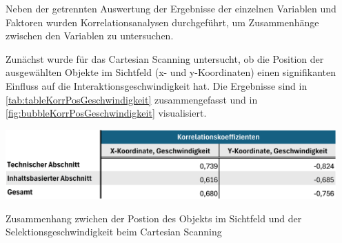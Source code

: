 Neben der getrennten Auswertung der Ergebnisse der einzelnen Variablen und Faktoren wurden Korrelationsanalysen durchgeführt, um Zusammenhänge zwischen den Variablen zu untersuchen.

Zunächst wurde für das Cartesian Scanning untersucht, ob die Position der ausgewählten Objekte im Sichtfeld (x- und y-Koordinaten) einen signifikanten Einfluss auf die Interaktionsgeschwindigkeit hat. Die Ergebnisse sind in \autoref{tab:tableKorrPosGeschwindigkeit} zusammengefasst und in \autoref{fig:bubbleKorrPosGeschwindigkeit} visualisiert. 

\begin{table}[tbh]
    \centering
    \includegraphics[width=0.95\textwidth]{images/Results/Korrelation-Position-Geschwindigkeit-Table.png}
    \caption{Zusammenhang zwichen der Postion des Objekts im Sichtfeld und der Selektionsgeschwindigkeit beim Cartesian Scanning}
    \label{tab:tableKorrPosGeschwindigkeit}
\end{table}

